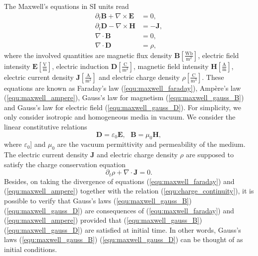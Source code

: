 \documentclass{article}
\begin{document}
The Maxwell's equations in SI units read
\begin{subequations}
\begin{align}
    \partial_t \mathbf{B} + \nabla \times \mathbf{E} &= 0, \label{equ:maxwell_faraday} \\ 
    \partial_t \mathbf{D} - \nabla \times \mathbf{H} &= -\mathbf{J}, \label{equ:maxwell_ampere} \\
    \nabla \cdot \mathbf{B} &= 0,  \label{equ:maxwell_gauss_B}\\
    \nabla \cdot \mathbf{D} &= \rho, \label{equ:maxwell_gauss_D}
\end{align}
\end{subequations}
where the involved quantities are magnetic flux density $\mathbf{B}[\frac{\text{Wb}}{\text{m}^2}]$, electric field intensity $\mathbf{E}[\frac{\text{V}}{\text{m}}]$, electric induction $\mathbf{D}[\frac{\text{C}}{\text{m}^2}]$, magnetic field intensity $\mathbf{H}[\frac{\text{A}}{\text{m}}]$, electric current density $\mathbf{J}[\frac{\text{A}}{\text{m}^2}]$ and electric charge density $\rho[\frac{\text{C}}{\text{m}^3}]$. These equations are known as Faraday's law (\ref{equ:maxwell_faraday}), Amp\`{e}re's law (\ref{equ:maxwell_ampere}), Gauss's law for magnetism (\ref{equ:maxwell_gauss_B}) and Gauss's law for electric field (\ref{equ:maxwell_gauss_D}). For simplicity, we only consider isotropic and homogeneous media in vacuum. We consider the linear constitutive relations 
\begin{equation} \label{equ:material_law}
    \mathbf{D} = \varepsilon_0 \mathbf{E}, \ \ \ \mathbf{B} = \mu_0\mathbf{H}, 
\end{equation}
where $\varepsilon_0]$ and $\mu_0$ are the vacuum permittivity and permeability of the medium. The electric current density $\mathbf{J}$ and electric charge density $\rho$ are supposed to satisfy the charge conservation equation
\begin{equation} \label{equ:charge_continuity}
    \partial_t\rho + \nabla \cdot \mathbf{J} = 0.
\end{equation}
Besides, on taking the divergence of equations (\ref{equ:maxwell_faraday}) and (\ref{equ:maxwell_ampere}) together with the relation (\ref{equ:charge_continuity}), it is possible to verify that Gauss's laws (\ref{equ:maxwell_gauss_B}) (\ref{equ:maxwell_gauss_D}) are consequences of (\ref{equ:maxwell_faraday}) and (\ref{equ:maxwell_ampere}) provided that (\ref{equ:maxwell_gauss_B}) (\ref{equ:maxwell_gauss_D}) are satisfied at initial time. In other words, Gauss's laws (\ref{equ:maxwell_gauss_B}) (\ref{equ:maxwell_gauss_D}) can be thought of as initial conditions. 
\end{document}
